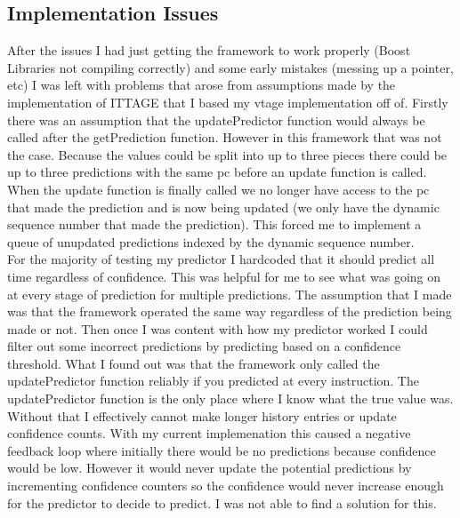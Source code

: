 \documentclass[12pt]{article}
\newcommand\tab[1][1cm]{\hspace*{#1}}
\begin{document}
\begin{multicols}{2}
\section{Implementation Issues} \label{implementationIssues}
\tab After the issues I had just getting the framework to work properly (Boost Libraries not compiling correctly) and some early mistakes (messing up a pointer, etc) I was left with problems that arose from assumptions made by the implementation of ITTAGE that I based my vtage implementation off of. Firstly there was an assumption that the updatePredictor function would always be called after the getPrediction function. However in this framework that was not the case. Because the values could be split into up to three pieces there could be up to three predictions with the same pc before an update function is called. When the update function is finally called we no longer have access to the pc that made the prediction and is now being updated (we only have the dynamic sequence number that made the prediction). This forced me to implement a queue of unupdated predictions indexed by the dynamic sequence number.\\
\tab For the majority of testing my predictor I hardcoded that it should predict all time regardless of confidence. This was helpful for me to see what was going on at every stage of prediction for multiple predictions. The assumption that I made was that the framework operated the same way regardless of the prediction being made or not. Then once I was content with how my predictor worked I could filter out some incorrect predictions by predicting based on a confidence threshold. What I found out was that the framework only called the updatePredictor function reliably if you predicted at every instruction. The updatePredictor function is the only place where I know what the true value was. Without that I effectively cannot make longer history entries or update confidence counts. With my current implemenation this caused a negative feedback loop where initially there would be no predictions because confidence would be low. However it would never update the potential predictions by incrementing confidence counters so the confidence would never increase enough for the predictor to decide to predict. I was not able to find a solution for this.

\end{multicols}
\end{document}
